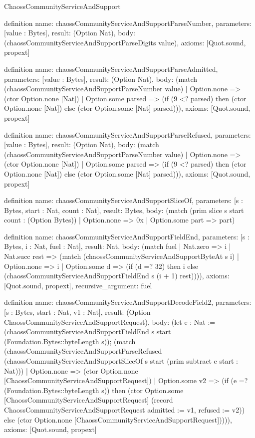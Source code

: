 \begin{lexlean}{ChaossCommunityServiceAndSupport}
\begin{semanticmodule}
definition{
  name: chaossCommunityServiceAndSupportParseNumber,
  parameters: [value : Bytes],
  result: (Option Nat),
  body: (chaossCommunityServiceAndSupportParseDigits value),
  axioms: [Quot.sound, propext]
}

definition{
  name: chaossCommunityServiceAndSupportParseAdmitted,
  parameters: [value : Bytes],
  result: (Option Nat),
  body: (match (chaossCommunityServiceAndSupportParseNumber value)
    | Option.none => (ctor Option.none [Nat])
    | Option.some parsed => (if (9 <? parsed) then (ctor Option.none [Nat]) else (ctor Option.some [Nat] parsed))),
  axioms: [Quot.sound, propext]
}

definition{
  name: chaossCommunityServiceAndSupportParseRefused,
  parameters: [value : Bytes],
  result: (Option Nat),
  body: (match (chaossCommunityServiceAndSupportParseNumber value)
    | Option.none => (ctor Option.none [Nat])
    | Option.some parsed => (if (9 <? parsed) then (ctor Option.none [Nat]) else (ctor Option.some [Nat] parsed))),
  axioms: [Quot.sound, propext]
}

definition{
  name: chaossCommunityServiceAndSupportSliceOf,
  parameters: [s : Bytes, start : Nat, count : Nat],
  result: Bytes,
  body: (match (prim slice s start count : (Option Bytes))
    | Option.none => 0x
    | Option.some part => part)
}

definition{
  name: chaossCommunityServiceAndSupportFieldEnd,
  parameters: [s : Bytes, i : Nat, fuel : Nat],
  result: Nat,
  body: (match fuel
    | Nat.zero => i
    | Nat.succ rest => (match (chaossCommunityServiceAndSupportByteAt s i)
      | Option.none => i
      | Option.some d => (if (d =? 32) then i else (chaossCommunityServiceAndSupportFieldEnd s (i + 1) rest)))),
  axioms: [Quot.sound, propext],
  recursive_argument: fuel
}

definition{
  name: chaossCommunityServiceAndSupportDecodeField2,
  parameters: [s : Bytes, start : Nat, v1 : Nat],
  result: (Option ChaossCommunityServiceAndSupportRequest),
  body: (let e : Nat := (chaossCommunityServiceAndSupportFieldEnd s start (Foundation.Bytes::byteLength s)); (match (chaossCommunityServiceAndSupportParseRefused (chaossCommunityServiceAndSupportSliceOf s start (prim subtract e start : Nat)))
    | Option.none => (ctor Option.none [ChaossCommunityServiceAndSupportRequest])
    | Option.some v2 => (if (e =? (Foundation.Bytes::byteLength s)) then (ctor Option.some [ChaossCommunityServiceAndSupportRequest] (record ChaossCommunityServiceAndSupportRequest {admitted := v1, refused := v2})) else (ctor Option.none [ChaossCommunityServiceAndSupportRequest])))),
  axioms: [Quot.sound, propext]
}


\end{semanticmodule}
\end{lexlean}
